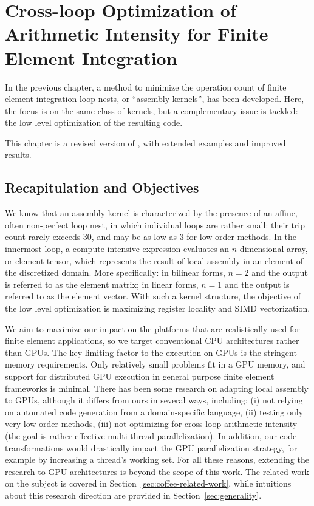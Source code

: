 \chapter{Cross-loop Optimization of Arithmetic Intensity for Finite Element Integration}
\label{ch:lowlevelopt}

In the previous chapter, a method to minimize the operation count of finite element integration loop nests, or ``assembly kernels'', has been developed. Here, the focus is on the same class of kernels, but a complementary issue is tackled: the low level optimization of the resulting code. 

This chapter is a revised version of \cite{Luporini-coffee}, with extended examples and improved results.

\section{Recapitulation and Objectives}

We know that an assembly kernel is characterized by the presence of an affine, often non-perfect loop nest, in which individual loops are rather small: their trip count rarely exceeds 30, and may be as low as 3 for low order methods. In the innermost loop, a compute intensive expression evaluates an $n$-dimensional array, or element tensor, which represents the result of local assembly in an element of the discretized domain. More specifically: in bilinear forms, $n=2$ and the output is referred to as the element matrix; in linear forms, $n=1$ and the output is referred to as the element vector. With such a kernel structure, the objective of the low level optimization is maximizing register locality and SIMD vectorization.

We aim to maximize our impact on the platforms that are realistically used for finite element applications, so we target conventional CPU architectures rather than GPUs. The key limiting factor to the execution on GPUs is the stringent memory requirements. Only relatively small problems fit in a GPU memory, and support for distributed GPU execution in general purpose finite element frameworks is minimal. There has been some research on adapting local assembly to GPUs, although it differs from ours in several ways, including: (i) not relying on automated code generation from a domain-specific language, (ii) testing only very low order methods, (iii) not optimizing for cross-loop arithmetic intensity (the goal is rather effective multi-thread parallelization). In addition, our code transformations would drastically impact the GPU parallelization strategy, for example by increasing a thread's working set. For all these reasons, extending the research to GPU architectures is beyond the scope of this work. The related work on the subject is covered in Section~\ref{sec:coffee-related-work}, while intuitions about this research direction are provided in Section~\ref{sec:generality}.

